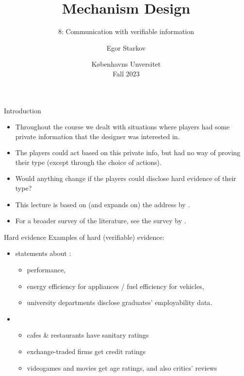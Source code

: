 \documentclass[english,10pt
,aspectratio=169
]{beamer}
\title{Mechanism Design}
\subtitle{8: Communication with verifiable information}
\author{Egor Starkov}
\date{K{\o}benhavns Unversitet \\
	Fall 2023}
\begin{document}
	\frame[plain]{\titlepage}



\begin{frame}{Introduction}
\begin{itemize}
	\item Throughout the course we dealt with situations where players had some private information that the designer was interested in.
	\item The players could act based on this private info, but had no way of proving their type (except through the choice of actions).
	\item Would anything change if the players could \alert{disclose hard evidence} of their type?
	\item This lecture is based on (and expands on) the address by \cite{dekel_evidence_2016}.
	\item For a broader survey of the literature, see the survey by \cite{dranove_quality_2010}.
\end{itemize}
\end{frame}


\begin{frame}{Hard evidence}
	Examples of hard (verifiable) evidence:
	\begin{itemize}
		\item statements about :
		\begin{itemize}
			\item performance, 
			\item energy efficiency for appliances / fuel efficiency for vehicles,
			\item university departments disclose graduates' employability data.
		\end{itemize}
		\item {} 
		\begin{itemize}
			\item cafes \& restaurants have sanitary ratings
			\item exchange-traded firms get credit ratings
			\item videogames and movies get age ratings, and also critics' reviews
		\end{itemize}
	\end{itemize}
\end{frame}
\end{document}
